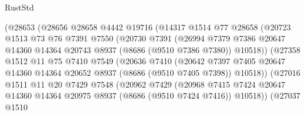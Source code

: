 \begin{lexlean}{RustStd}
\begin{coremodule}
                      (@28653
                        (@28656
                          @28658
                          @4442
                          @19716
                          (@14317
                            @1514
                            @77
                            @28658
                            (@20723
                              @1513
                              @73
                              @76
                              @7391
                              @7550
                              (@20730
                                @7391
                                (@26994
                                  @7379
                                  @7386
                                  @20647
                                  @14360
                                  @14364
                                  @20743
                                  @8937
                                  (@8686 (@9510 @7386 @7380))
                                  @10518))
                              (@27358
                                @1512
                                @11
                                @75
                                @7410
                                @7549
                                (@20636
                                  @7410
                                  (@20642
                                    @7397
                                    @7405
                                    @20647
                                    @14360
                                    @14364
                                    @20652
                                    @8937
                                    (@8686 (@9510 @7405 @7398))
                                    @10518))
                                (@27016
                                  @1511
                                  @11
                                  @20
                                  @7429
                                  @7548
                                  (@20962
                                    @7429
                                    (@20968
                                      @7415
                                      @7424
                                      @20647
                                      @14360
                                      @14364
                                      @20975
                                      @8937
                                      (@8686 (@9510 @7424 @7416))
                                      @10518))
                                  (@27037
                                    @1510

\end{coremodule}
\end{lexlean}
